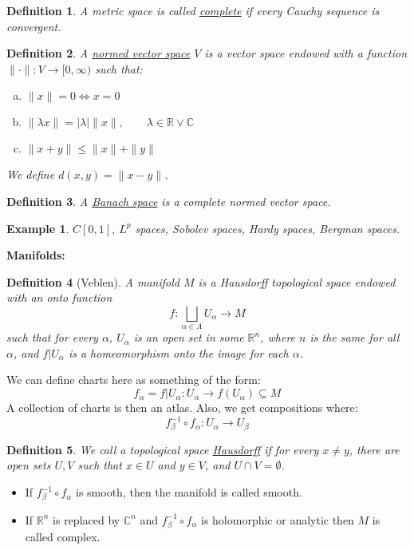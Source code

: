 \documentclass{article}
\newcommand{\R}{\mathbb{R}}
\newcommand{\C}{\mathbb{C}}
\newtheorem{example}{Example}
\newtheorem{definition}{Definition}
\begin{document}
\begin{definition}
A metric space is called \underline{complete} if every Cauchy sequence is convergent.
\end{definition}
\begin{definition}
A \underline{normed vector space} $V$ is a vector space endowed with a function
$\|\cdot \|: V\rightarrow [0,\infty)$ such that:
\begin{enumerate}[(a)]
    \item $\|x\|=0 \iff x=0$
    \item $\|\lambda x\|=|\lambda| \|x\|,\qquad \lambda\in \R\vee \C$
    \item $\|x+y\|\leq \|x\|+\|y\|$
\end{enumerate}
We define $d(x,y)=\|x-y\|$.
\end{definition}
\begin{definition}
A \underline{Banach space} is a complete normed vector space.
\end{definition}
\begin{example}
$C[0,1]$, $L^p$ spaces, Sobolev spaces, Hardy spaces, Bergman spaces.
\end{example}
\newpage
\noindent \textbf{Manifolds:}
\begin{definition}[Veblen]
A manifold $M$ is a Hausdorff topological space endowed with an onto function $$f:\displaystyle\bigsqcup_{\alpha\in A} U_\alpha\rightarrow M$$ such that for every $\alpha$, $U_\alpha$ is an open set in some $\R^n$, where $n$ is the same for all $\alpha$, and $f|U_\alpha$ is a homeomorphism onto the image for each $\alpha$. 
\end{definition}
We can define charts here as something of the form:
$$f_\alpha = f|U_\alpha: U_\alpha\rightarrow f(U_\alpha)\subseteq M$$
A collection of charts is then an atlas. Also, we get compositions where:
$$f_\beta^{-1}\circ f_\alpha: U_\alpha\rightarrow U_\beta$$
\begin{definition}
We call a topological space \underline{Hausdorff} if for every $x\neq y$, there are open sets $U,V$ such that $x\in U$ and $y\in V$, and $U\cap V=\emptyset$.
\end{definition}
\begin{itemize}
    \item If $f_\beta^{-1}\circ f_\alpha$ is smooth, then the manifold is called smooth. 
    \item If $\R^n$ is replaced by $\C^n$ and $f_\beta^{-1}\circ f_\alpha$ is holomorphic or analytic then $M$ is called complex.
\end{itemize}
\end{document}
